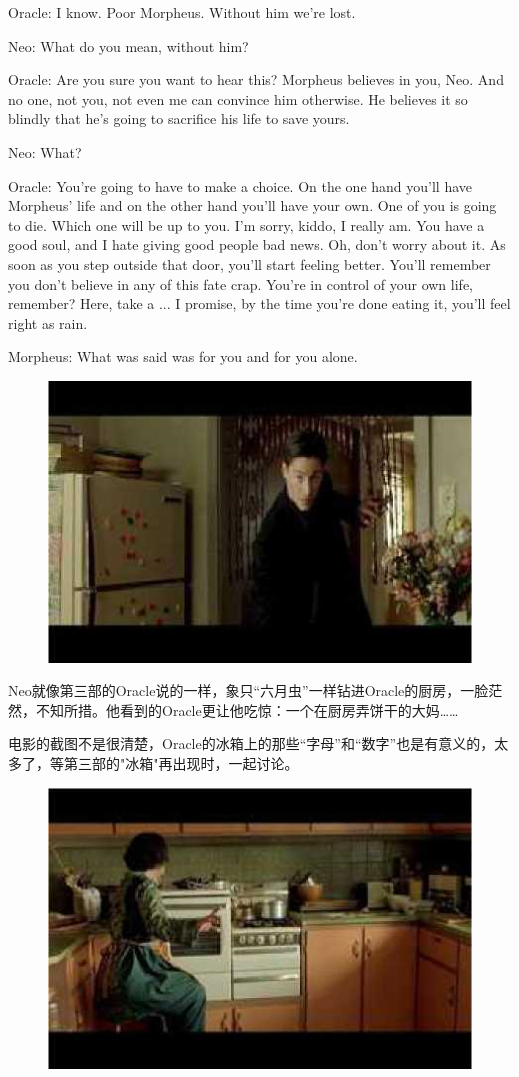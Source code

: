 \documentclass[UTF8]{ctexart}
\newenvironment{myquote}{\color{green} \setlength{\leftskip}{6em} \setlength{\rightskip}{4em} \setlength{\parindent}{-2em}}{\par}
\begin{document}
\begin{myquote}
Oracle: I know. Poor Morpheus. Without him we're lost.

Neo: What do you mean, without him?

Oracle: Are you sure you want to hear this? Morpheus believes in you, Neo. And no one, not you, not even me can convince him otherwise. He believes it so blindly that he's going to sacrifice his life to save yours.

Neo: What?

Oracle: You're going to have to make a choice. On the one hand you'll have Morpheus' life and on the other hand you'll have your own. One of you is going to die. Which one will be up to you. I'm sorry, kiddo, I really am. You have a good soul, and I hate giving good people bad news. Oh, don't worry about it. As soon as you step outside that door, you'll start feeling better. You'll remember you don't believe in any of this fate crap. You're in control of your own life, remember? Here, take a ... I promise, by the time you're done eating it, you'll feel right as rain.

Morpheus: What was said was for you and for you alone.
\end{myquote}

\begin{figure}[htb]
\centering
\includegraphics[width=0.5\linewidth]{fig/read_Matrix-46}
\end{figure}

Neo就像第三部的Oracle说的一样，象只“六月虫”一样钻进Oracle的厨房，一脸茫然，不知所措。他看到的Oracle更让他吃惊：一个在厨房弄饼干的大妈……

电影的截图不是很清楚，Oracle的冰箱上的那些“字母”和“数字”也是有意义的，太多了，等第三部的"冰箱"再出现时，一起讨论。

\begin{figure}[htb]
\centering
\includegraphics[width=0.5\linewidth]{fig/read_Matrix-47}
\end{figure}
\end{document}

